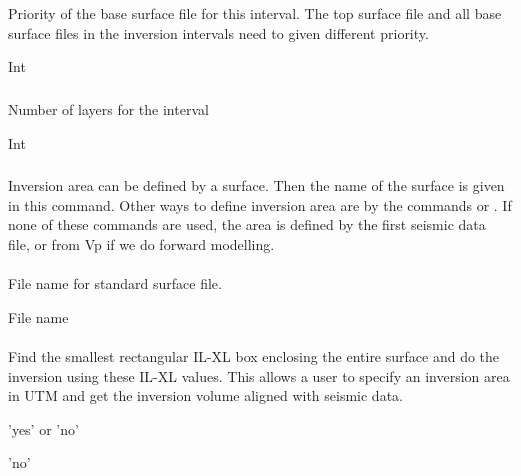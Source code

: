  
 \slist
   \item \Description Priority of the base surface file for this interval. The top surface file and all base surface files in the inversion intervals need to given different priority.
   \item \Argument Int
   \item \Default
 \elist

\subparagraph{ \necessary} 
 \slist
   \item \Description Number of layers for the interval
   \item \Argument Int
   \item \Default
 \elist

\subsubsection{}
 \slist
   \item \Description Inversion area can be defined by a surface. Then
     the name of the surface is given in this command. Other ways to
     define inversion area are by the commands  or
     . If none of these commands are
     used, the area is defined by the first seismic data file, or from
     Vp if we do forward modelling.
   \item \Argument
   \item \Default
 \elist

\paragraph{}
\slist
   \item \Description File name for standard surface file.
   \item \Argument File name
   \item \Default
 \elist

\paragraph{}
\slist
   \item \Description Find the smallest rectangular IL-XL box
     enclosing the entire surface and do the inversion using these
     IL-XL values. This allows a user to specify an inversion area in
     UTM and get the inversion volume aligned with seismic data.
   \item \Argument  'yes' or 'no'
   \item \Default 'no'
 \elist


